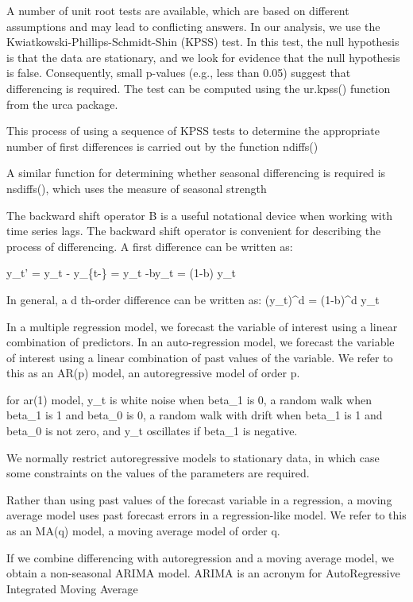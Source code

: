 \documentclass[]{book}
\begin{document}
A number of unit root tests are available, which are based on different
assumptions and may lead to conflicting answers. In our analysis, we use
the Kwiatkowski-Phillips-Schmidt-Shin (KPSS) test. In this test, the
null hypothesis is that the data are stationary, and we look for
evidence that the null hypothesis is false. Consequently, small p-values
(e.g., less than 0.05) suggest that differencing is required. The test
can be computed using the ur.kpss() function from the urca package.

This process of using a sequence of KPSS tests to determine the
appropriate number of first differences is carried out by the function
ndiffs()

A similar function for determining whether seasonal differencing is
required is nsdiffs(), which uses the measure of seasonal strength

The backward shift operator B is a useful notational device when working
with time series lags. The backward shift operator is convenient for
describing the process of differencing. A first difference can be
written as:

y\_t' = y\_t - y\_\{t-\} = y\_t -by\_t = (1-b) y\_t

In general, a d th-order difference can be written as: (y\_t)\^{}d =
(1-b)\^{}d y\_t

In a multiple regression model, we forecast the variable of interest
using a linear combination of predictors. In an auto-regression model,
we forecast the variable of interest using a linear combination of past
values of the variable. We refer to this as an AR(p) model, an
autoregressive model of order p.

for ar(1) model, y\_t is white noise when beta\_1 is 0, a random walk
when beta\_1 is 1 and beta\_0 is 0, a random walk with drift when
beta\_1 is 1 and beta\_0 is not zero, and y\_t oscillates if beta\_1 is
negative.

We normally restrict autoregressive models to stationary data, in which
case some constraints on the values of the parameters are required.

Rather than using past values of the forecast variable in a regression,
a moving average model uses past forecast errors in a regression-like
model. We refer to this as an MA(q) model, a moving average model of
order q.

If we combine differencing with autoregression and a moving average
model, we obtain a non-seasonal ARIMA model. ARIMA is an acronym for
AutoRegressive Integrated Moving Average
\end{document}
